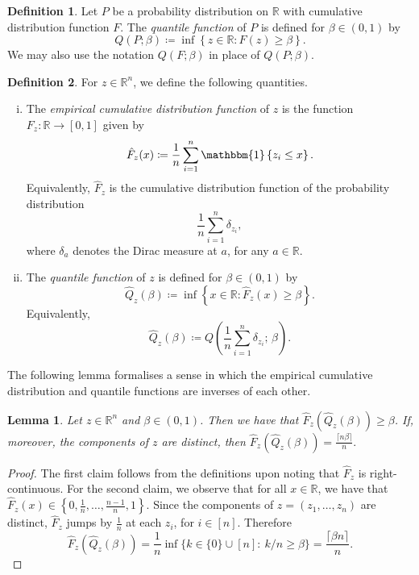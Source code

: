 \documentclass[11pt, titlepage]{article} %
\newcommand{\Ind}[1]{\mathbbm{1}\left\{ #1 \right\}}
\numberwithin{equation}{section}
\newtheorem{lemma}{Lemma}
\theoremstyle{definition}
\newtheorem{definition}{Definition}
\numberwithin{theorem}{section}
\numberwithin{lemma}{section}
\numberwithin{corollary}{section}
\numberwithin{proposition}{section}
\numberwithin{definition}{section}
\numberwithin{remark}{section}
\begin{document}
\begin{definition}
    Let \(P\) be a probability distribution on \(\mathbb{R}\) with cumulative distribution function \(F\). The \textit{quantile function} of \(P\) is defined for \(\beta \in (0,1)\) by \[Q(P;\beta) \coloneqq \inf\left\{ z \in \mathbb{R}: F(z) \geq \beta \right\}.\] We may also use the notation \(Q(F;\beta)\) in place of \(Q(P;\beta)\).
\label{defn:prob_quantile}
\end{definition}

\begin{definition}
    For \(z \in \mathbb{R}^n\), we define the following quantities. \begin{enumerate}[(i)] \itemsep0em
        \item The \textit{empirical cumulative distribution function} of \(z\) is the function \(F_z: \mathbb{R} \to [0,1]\) given by \[\hat{F}_z(x) \coloneqq \frac{1}{n}\sum_{i=1}^n \Ind{z_i \leq x}.  \] Equivalently, \(\hat{F}_z\) is the cumulative distribution function of the probability distribution \[\frac{1}{n} \sum_{i=1}^n \delta_{z_i},\] where \(\delta_{a}\) denotes the Dirac measure at \(a\), for any \(a \in \mathbb{R}\).
        \item The \textit{quantile function} of \(z\) is defined for \(\beta \in (0,1)\) by \[\hat{Q}_z(\beta) \coloneqq \inf \left\{ x \in \mathbb{R}: \hat{F}_z(x) \geq \beta \right\}.\] Equivalently, \[\hat{Q}_z(\beta) \coloneqq Q\left( \frac{1}{n}\sum_{i=1}^n \delta_{z_i} ; \, \beta \right).\]
    \end{enumerate}
\label{defn:empirical_cdfquantile}
\end{definition}

\noindent
The following lemma formalises a sense in which the empirical cumulative distribution and quantile functions are inverses of each other.

\begin{lemma}
    Let \(z \in \mathbb{R}^n\) and \(\beta \in (0,1)\). Then we have that \(\hat{F}_z\left(\hat{Q}_z(\beta)\right) \geq \beta\). If, moreover, the components of \(z\) are distinct, then \(\hat{F}_z\left(\hat{Q}_z(\beta)\right) = \frac{\lceil{n\beta}\rceil}{n}.\)
\label{lemma:cdfquantile}
\end{lemma}
\begin{proof}
    The first claim follows from the definitions upon noting that \(\hat{F}_z\) is right-continuous. For the second claim, we observe that for all \(x \in \mathbb{R}\), we have that \(\hat{F}_z(x) \in \left\{0, \frac{1}{n}, \ldots, \frac{n-1}{n}, 1\right\}\). Since the components of \(z = (z_1, \ldots, z_n)\) are distinct, \(\hat{F}_z\) jumps by \(\frac{1}{n}\) at each \(z_i\), for \(i \in [n]\). Therefore \[\hat{F}_z\left(\hat{Q}_z(\beta)\right) = \frac{1}{n} \inf \{k \in \{0\} \cup [n]: \ k/n \geq \beta \} = \frac{\lceil{\beta n}\rceil}{n}.\]
\end{proof}
\end{document}
